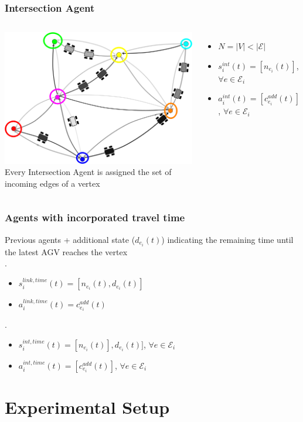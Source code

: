 \documentclass{beamer}
\begin{document}
	\begin{frame}
		\frametitle{Intersection Agent}
		\begin{columns}
			\includegraphics[width=\textwidth]{intersection.png}
			Every Intersection Agent is assigned the set of incoming edges of a vertex
			\begin{itemize}
				\item $N = |V| < |\mathcal{E}|$
				\item $s_i^{int}(t) = [n_{e_i}(t)]$, $\forall e \in \mathcal{E}_i$
				\item $a_i^{int}(t) = [c_{e_i}^{add}(t)]$, $\forall e \in \mathcal{E}_i$
			\end{itemize}
		\end{columns}
	\end{frame}
	\begin{frame}
		\frametitle{Agents with incorporated travel time}
		Previous agents + additional state ($d_{e_i}(t)$)
		indicating the remaining time until the latest AGV reaches the vertex \\ .
		\begin{itemize}
			\item $s_i^{link,time}(t) = [n_{e_i}(t), d_{e_i}(t)]$
			\item $a_i^{link,time}(t) = c_{e_i}^{add}(t)$
		\end{itemize}
.
		\begin{itemize}
			\item $s_i^{int,time}(t) = [n_{e_i}(t)], d_{e_i}(t)]$, $\forall e \in \mathcal{E}_i$
			\item $a_i^{int,time}(t) = [c_{e_i}^{add}(t)]$, $\forall e \in \mathcal{E}_i$
		\end{itemize}
	\end{frame}
	\section{Experimental Setup}
	\begin{frame}
	\end{frame}
\end{document}
